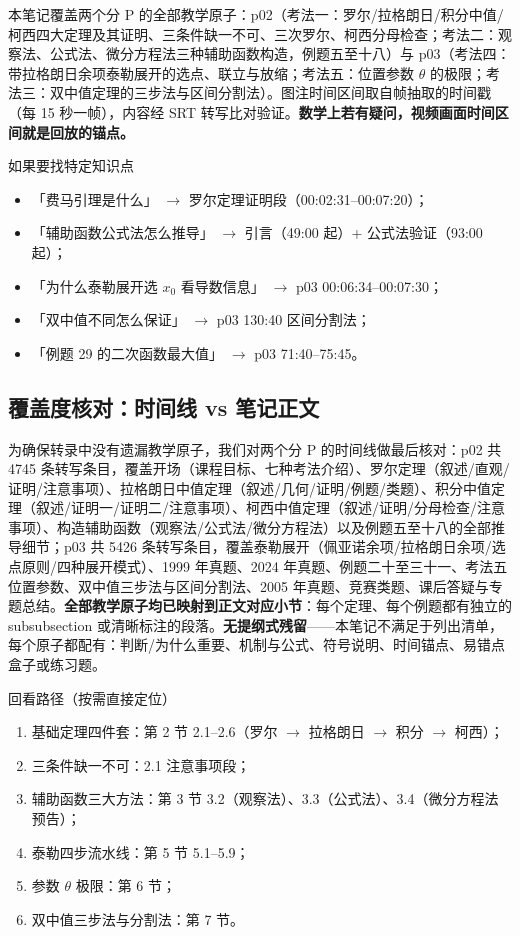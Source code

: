\documentclass[a4paper]{article}
\begin{document}
本笔记覆盖两个分 P 的全部教学原子：p02（考法一：罗尔/拉格朗日/积分中值/柯西四大定理及其证明、三条件缺一不可、三次罗尔、柯西分母检查；考法二：观察法、公式法、微分方程法三种辅助函数构造，例题五至十八）与 p03（考法四：带拉格朗日余项泰勒展开的选点、联立与放缩；考法五：位置参数 $\theta$ 的极限；考法三：双中值定理的三步法与区间分割法）。图注时间区间取自帧抽取的时间戳（每 15 秒一帧），内容经 SRT 转写比对验证。\textbf{数学上若有疑问，视频画面时间区间就是回放的锚点。}

\begin{knowledgebox}{如果要找特定知识点}
\begin{itemize}
\item 「费马引理是什么」 $\rightarrow$ 罗尔定理证明段（00:02:31--00:07:20）；
\item 「辅助函数公式法怎么推导」 $\rightarrow$ 引言（49:00 起）+ 公式法验证（93:00 起）；
\item 「为什么泰勒展开选 $x_0$ 看导数信息」 $\rightarrow$ p03 00:06:34--00:07:30；
\item 「双中值不同怎么保证」 $\rightarrow$ p03 130:40 区间分割法；
\item 「例题 29 的二次函数最大值」 $\rightarrow$ p03 71:40--75:45。
\end{itemize}
\end{knowledgebox}


\subsection{覆盖度核对：时间线 vs 笔记正文}

为确保转录中没有遗漏教学原子，我们对两个分 P 的时间线做最后核对：p02 共 4745 条转写条目，覆盖开场（课程目标、七种考法介绍）、罗尔定理（叙述/直观/证明/注意事项）、拉格朗日中值定理（叙述/几何/证明/例题/类题）、积分中值定理（叙述/证明一/证明二/注意事项）、柯西中值定理（叙述/证明/分母检查/注意事项）、构造辅助函数（观察法/公式法/微分方程法）以及例题五至十八的全部推导细节；p03 共 5426 条转写条目，覆盖泰勒展开（佩亚诺余项/拉格朗日余项/选点原则/四种展开模式）、1999 年真题、2024 年真题、例题二十至三十一、考法五位置参数、双中值三步法与区间分割法、2005 年真题、竞赛类题、课后答疑与专题总结。\textbf{全部教学原子均已映射到正文对应小节}：每个定理、每个例题都有独立的 subsubsection 或清晰标注的段落。\textbf{无提纲式残留}——本笔记不满足于列出清单，每个原子都配有：判断/为什么重要、机制与公式、符号说明、时间锚点、易错点盒子或练习题。

\begin{importantbox}{回看路径（按需直接定位）}
\begin{enumerate}
\item 基础定理四件套：第 2 节 2.1--2.6（罗尔 $\to$ 拉格朗日 $\to$ 积分 $\to$ 柯西）；
\item 三条件缺一不可：2.1 注意事项段；
\item 辅助函数三大方法：第 3 节 3.2（观察法）、3.3（公式法）、3.4（微分方程法预告）；
\item 泰勒四步流水线：第 5 节 5.1--5.9；
\item 参数 $\theta$ 极限：第 6 节；
\item 双中值三步法与分割法：第 7 节。
\end{enumerate}
\end{importantbox}
\end{document}
